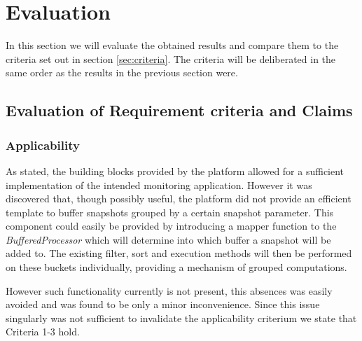 \section{Evaluation}
\label{sec:eval}
In this section we will evaluate the obtained results and compare them to the criteria set out in section \ref{sec:criteria}. The criteria will be deliberated in the same order as the results in the previous section were.

\subsection{Evaluation of Requirement criteria and Claims}
\subsubsection{Applicability}
As stated, the building blocks provided by the platform allowed for a sufficient implementation of the intended monitoring application. However it was discovered that, though possibly useful, the platform did not provide an efficient template to buffer snapshots grouped by a certain snapshot parameter.  This component could easily be provided by introducing a mapper function to the \emph{BufferedProcessor} which will determine into which buffer a snapshot will be added to. The existing filter, sort and execution methods will then be performed on these buckets individually, providing a mechanism of grouped computations.

However such functionality currently is not present, this absences was easily avoided and was found to be only a minor inconvenience. Since this issue singularly was not sufficient to invalidate the applicability criterium we state that Criteria 1-3 hold.


